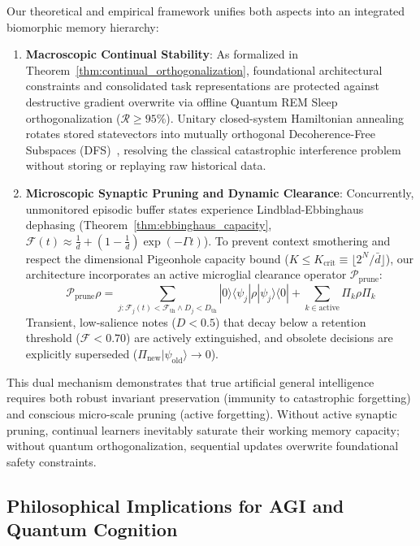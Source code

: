 \documentclass[10pt,twocolumn,3p]{article}
\begin{document}
Our theoretical and empirical framework unifies both aspects into an integrated biomorphic memory hierarchy:
\begin{enumerate}
    \item \textbf{Macroscopic Continual Stability}: As formalized in Theorem~\ref{thm:continual_orthogonalization}, foundational architectural constraints and consolidated task representations are protected against destructive gradient overwrite via offline Quantum REM Sleep orthogonalization ($\mathcal{R} \ge 95\%$). Unitary closed-system Hamiltonian annealing rotates stored statevectors into mutually orthogonal Decoherence-Free Subspaces (DFS)~\cite{lidar1998}, resolving the classical catastrophic interference problem without storing or replaying raw historical data.
    \item \textbf{Microscopic Synaptic Pruning and Dynamic Clearance}: Concurrently, unmonitored episodic buffer states experience Lindblad-Ebbinghaus dephasing (Theorem~\ref{thm:ebbinghaus_capacity}, $\mathcal{F}(t) \approx \frac{1}{d} + (1 - \frac{1}{d}) \exp(-\Gamma t)$). To prevent context smothering and respect the dimensional Pigeonhole capacity bound ($K \le K_{\text{crit}} \equiv \lfloor 2^N / \bar{d} \rfloor$), our architecture incorporates an active microglial clearance operator $\mathcal{P}_{\text{prune}}$:
    \begin{equation}
        \mathcal{P}_{\text{prune}} \rho = \sum_{j : \mathcal{F}_j(t) < \mathcal{F}_{\text{th}} \wedge D_j < D_{\text{th}}} |0\rangle \langle \psi_j| \rho |\psi_j\rangle \langle 0| + \sum_{k \in \text{active}} \Pi_k \rho \Pi_k
    \end{equation}
    Transient, low-salience notes ($D < 0.5$) that decay below a retention threshold ($\mathcal{F} < 0.70$) are actively extinguished, and obsolete decisions are explicitly superseded ($\Pi_{\text{new}} |\psi_{\text{old}}\rangle \to 0$).
\end{enumerate}
This dual mechanism demonstrates that true artificial general intelligence requires both robust invariant preservation (immunity to catastrophic forgetting) and conscious micro-scale pruning (active forgetting). Without active synaptic pruning, continual learners inevitably saturate their working memory capacity; without quantum orthogonalization, sequential updates overwrite foundational safety constraints.

\subsection{Philosophical Implications for AGI and Quantum Cognition}
\label{subsec:philosophical}
\end{document}

